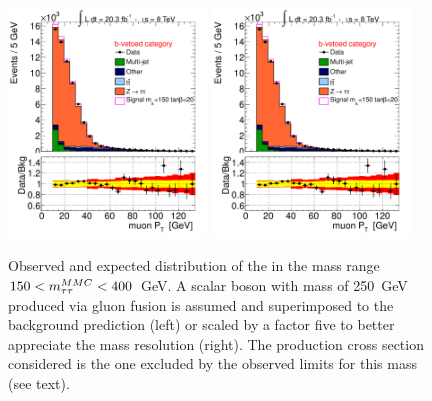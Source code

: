 \begin{figure}[tp]
  \centering
            \includegraphics[page=5, width=0.47\textwidth]{figure/final_plots/Bveto_final.pdf}
            \includegraphics[page=12, width=0.47\textwidth]{figure/final_plots/Bveto_final.pdf}
    \caption{ Observed and expected distribution of the \mmc in the mass range $150 < m_{\tau\tau}^{MMC} < 400 $~GeV. A scalar boson 
	with mass of 250~GeV produced via gluon fusion is assumed and  superimposed to the background prediction (left) 
	or scaled by a factor five to better appreciate the mass resolution (right). The production cross section considered is the one excluded
	by the observed limits for this mass (see text).}
	
\label{fig:excess}
\end{figure}



